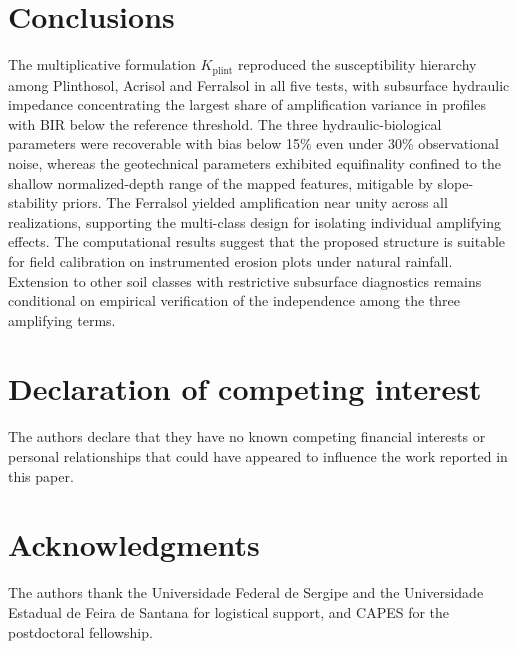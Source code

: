 \documentclass[preprint,review,12pt,authoryear]{elsarticle}
\begin{document}
\section{Conclusions}
\label{sec:conclusions}

The multiplicative formulation $K_{\mathrm{plint}}$ reproduced the susceptibility hierarchy among Plinthosol, Acrisol and Ferralsol in all five tests, with subsurface hydraulic impedance concentrating the largest share of amplification variance in profiles with BIR below the reference threshold. The three hydraulic-biological parameters were recoverable with bias below 15\% even under 30\% observational noise, whereas the geotechnical parameters exhibited equifinality confined to the shallow normalized-depth range of the mapped features, mitigable by slope-stability priors. The Ferralsol yielded amplification near unity across all realizations, supporting the multi-class design for isolating individual amplifying effects. The computational results suggest that the proposed structure is suitable for field calibration on instrumented erosion plots under natural rainfall. Extension to other soil classes with restrictive subsurface diagnostics remains conditional on empirical verification of the independence among the three amplifying terms.

\section*{Declaration of competing interest}

The authors declare that they have no known competing financial interests or personal relationships that could have appeared to influence the work reported in this paper.

\section*{Acknowledgments}

The authors thank the Universidade Federal de Sergipe and the Universidade Estadual de Feira de Santana for logistical support, and CAPES for the postdoctoral fellowship.
\end{document}
